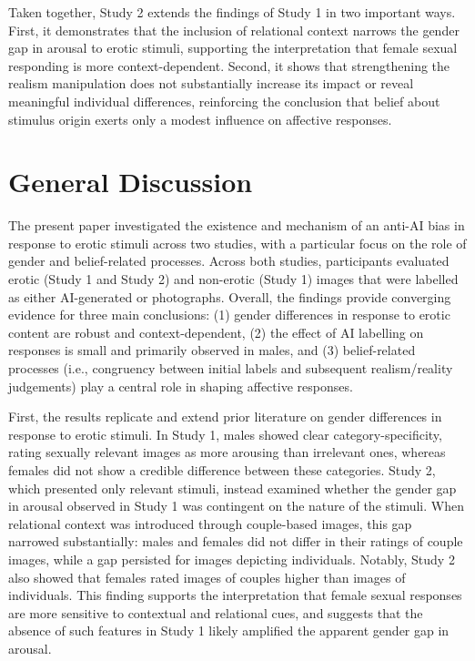 \documentclass[
  jou,
  floatsintext,
  longtable,
  nolmodern,
  notxfonts,
  notimes,
  colorlinks=true,linkcolor=blue,citecolor=blue,urlcolor=blue]{apa7}
\begin{document}
Taken together, Study 2 extends the findings of Study 1 in two important
ways. First, it demonstrates that the inclusion of relational context
narrows the gender gap in arousal to erotic stimuli, supporting the
interpretation that female sexual responding is more context-dependent.
Second, it shows that strengthening the realism manipulation does not
substantially increase its impact or reveal meaningful individual
differences, reinforcing the conclusion that belief about stimulus
origin exerts only a modest influence on affective responses.

\section{General Discussion}\label{general-discussion}

The present paper investigated the existence and mechanism of an anti-AI
bias in response to erotic stimuli across two studies, with a particular
focus on the role of gender and belief-related processes. Across both
studies, participants evaluated erotic (Study 1 and Study 2) and
non-erotic (Study 1) images that were labelled as either AI-generated or
photographs. Overall, the findings provide converging evidence for three
main conclusions: (1) gender differences in response to erotic content
are robust and context-dependent, (2) the effect of AI labelling on
responses is small and primarily observed in males, and (3)
belief-related processes (i.e., congruency between initial labels and
subsequent realism/reality judgements) play a central role in shaping
affective responses.

First, the results replicate and extend prior literature on gender
differences in response to erotic stimuli. In Study 1, males showed
clear category-specificity, rating sexually relevant images as more
arousing than irrelevant ones, whereas females did not show a credible
difference between these categories. Study 2, which presented only
relevant stimuli, instead examined whether the gender gap in arousal
observed in Study 1 was contingent on the nature of the stimuli. When
relational context was introduced through couple-based images, this gap
narrowed substantially: males and females did not differ in their
ratings of couple images, while a gap persisted for images depicting
individuals. Notably, Study 2 also showed that females rated images of
couples higher than images of individuals. This finding supports the
interpretation that female sexual responses are more sensitive to
contextual and relational cues, and suggests that the absence of such
features in Study 1 likely amplified the apparent gender gap in arousal.
\end{document}
